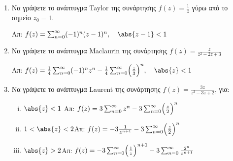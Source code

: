 




\everymath{\displaystyle}



\begin{center}
  \minibox{\large\bfseries  \textcolor{Col1}{Ασκήσεις στις σειρές Laurent}}
\end{center}

\vspace{\baselineskip} 

\begin{enumerate}

\item Να γράψετε το ανάπτυγμα Taylor της συνάρτησης $f(z)=\frac{1}{z}$ γύρω από το 
  σημείο $z_0=1$. 

\hfill Απ: $f(z)=\sum_{n=0}^{\infty}(-1)^n(z-1)^n, \quad \abs{z-1}<1$

\item Να γράψετε το ανάπτυγμα Maclaurin της συνάρτησης $f(z)=\frac{z}{z^2-2z+3}$

\hfill Απ: $f(z)=\frac{1}{4}\sum_{n=0}^{\infty}(-1)^nz^n-\frac{1}{4}\sum_{n=0}
^{\infty}\Bigl(\frac{z}{3}\Bigr)^n, \quad \abs{z}<1$



\item Να γράψετε το ανάπτυγμα Laurent της συνάρτησης $f(z)=\frac{3z}{z^2-3z+2}$, για: 

\begin{enumerate}[i)]
\item $\abs{z}<1\hfill$  Απ: $f(z)=3\sum_{n=0}^{\infty}z^n-3\sum_{n=0}^{\infty}\Bigl(\frac{z}{2}\Bigr)^n$
\item $1<\abs{z}<2$\hfill Απ: $f(z)=-3\frac{1}{z^{n+1}}-3\sum_{n=0}^{\infty}\Bigl(\frac{z}{2}\Bigr)^n$
\item $\abs{z}>2$\hfill Απ: $f(z)=-3\sum_{n=0}^{\infty}\Bigl(\frac{1}{z}\Bigr)^{n+1}-3\sum_{n=0}^{\infty}\frac{2^n}{z^{n+1}}$
\end{enumerate}


\end{enumerate}
